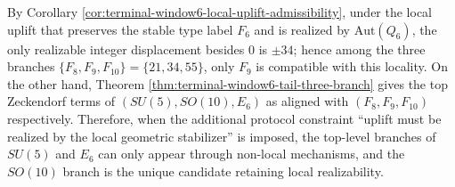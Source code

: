 \begin{remark}\label{rem:window6-local-uplift-excludes-su5-e6}
By Corollary \ref{cor:terminal-window6-local-uplift-admissibility},
under the local uplift that preserves the stable type label \(F_6\) and is realized by \(\mathrm{Aut}(Q_6)\), the only realizable integer displacement besides \(0\) is \(\pm 34\);
hence among the three branches \(\{F_8,F_9,F_{10}\}=\{21,34,55\}\), only \(F_9\) is compatible with this locality.
On the other hand, Theorem \ref{thm:terminal-window6-tail-three-branch} gives the top Zeckendorf terms of \((SU(5),SO(10),E_6)\) as aligned with \((F_8,F_9,F_{10})\) respectively.
Therefore, when the additional protocol constraint ``uplift must be realized by the local geometric stabilizer'' is imposed,
the top-level branches of \(SU(5)\) and \(E_6\) can only appear through non-local mechanisms, and the \(SO(10)\) branch is the unique candidate retaining local realizability.
\end{remark}

